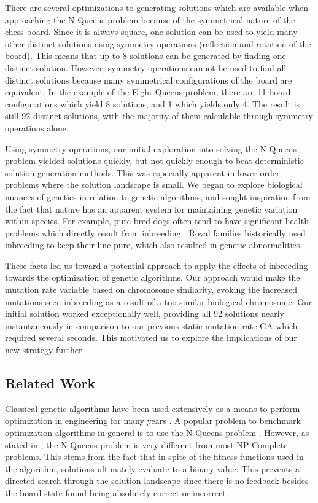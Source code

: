 \documentclass{sig-alternate}
\begin{document}
There are several optimizations to generating solutions which are available when approaching the N-Queens problem because of the symmetrical nature of the chess board. Since it is always square, one solution can be used to yield many other distinct solutions using symmetry operations (reflection and rotation of the board). This means that up to 8 solutions can be generated by finding one distinct solution. However, symmetry operations cannot be used to find all distinct solutions because many symmetrical configurations of the board are equivalent. In the example of the Eight-Queens problem, there are 11 board configurations which yield 8 solutions, and 1 which yields only 4. The result is still 92 distinct solutions, with the majority of them calculable through symmetry operations alone.

Using symmetry operations, our initial exploration into solving the N-Queens problem yielded solutions quickly, but not quickly enough to beat deterministic solution generation methods. This was especially apparent in lower order problems where the solution landscape is small. We began to explore biological nuances of genetics in relation to genetic algorithms, and sought inspiration from the fact that nature has an apparent system for maintaining genetic variation within species. For example, pure-bred dogs often tend to have significant health problems which directly result from inbreeding \cite{clark1983medical}. Royal families historically used inbreeding to keep their line pure, which also resulted in genetic abnormalities\cite{mannucci2001hemophilias}.

These facts led us toward a potential approach to apply the effects of inbreeding towards the optimization of genetic algorithms. Our approach would make the mutation rate variable based on chromosome similarity, evoking the increased mutations seen inbreeding as a result of a too-similar biological chromosome. Our initial solution worked exceptionally well, providing all 92 solutions nearly instantaneously in comparison to our previous static mutation rate GA which required several seconds. This motivated us to explore the implications of our new strategy further.

\subsection{Related Work}
Classical genetic algorithms have been used extensively as a means to perform optimization in engineering for many years \cite{goldberg1994genetic,srinivas1994genetic,de1989using}. A popular problem to benchmark optimization algorithms in general is to use the N-Queens problem \cite{homaifar1992queens,crawford1992solving}. However, as stated in \cite{crawford1992solving}, the N-Queens problem is very different from most NP-Complete problems. This stems from the fact that in spite of the fitness functions used in the algorithm, solutions ultimately evaluate to a binary value. This prevents a directed search through the solution landscape since there is no feedback besides the board state found being absolutely correct or incorrect. 
\end{document}
